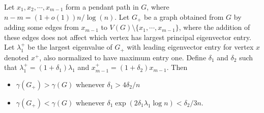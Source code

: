\begin{lemma}\label{change}
Let $x_1, x_2, \cdots, x_{m-1}$ form a pendant path
  in $G$, where $n-m = (1+o(1)) n/\log(n)$.
  Let $G_+$ be a graph obtained from $G$ by adding some edges from $x_{m-1}$ to $V(G)\setminus \{x_1,\cdots, x_{m-1}\}$,
  where the addition of these edges does not affect which vertex
  has largest principal eigenvector entry.  Let
  $\lambda_1^+$ be the largest eigenvalue of $G_+$ with leading eigenvector
  entry for vertex $x$ denoted $x^+$, also normalized to have maximum
  entry one.  
  Define $\delta_1$ and $\delta_2$ such that
  $\lambda_1^+ = (1 + \delta_1) \lambda_1$ and
  $x_{m-1}^+ = (1 + \delta_2) x_{m-1}$.  Then 
  \begin{itemize}
     \item $\gamma(G_+) > \gamma(G)$ whenever $\delta_1 > 4 \delta_2 / n$
     \item $\gamma(G_+) < \gamma(G)$ whenever $\delta_1 \exp(2 \delta_1 \lambda_1 \log n ) <  \delta_2 / 3 n$.
  \end{itemize}
\end{lemma}
